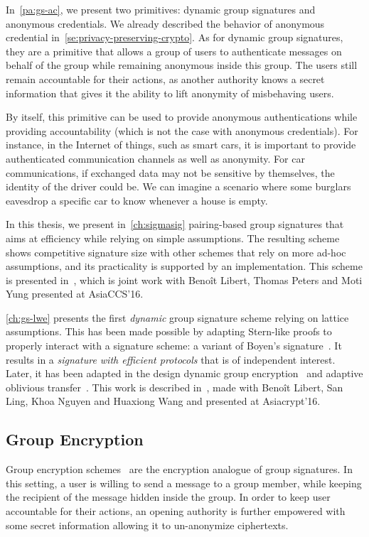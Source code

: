 In~\cref{pa:gs-ac}, we present two primitives: dynamic group signatures and anonymous credentials.
We already described the behavior of anonymous credential in~\cref{se:privacy-preserving-crypto}.
As for dynamic group signatures, they are a primitive that allows a group of users to authenticate messages on behalf of the group while remaining anonymous inside this group.
The users still remain accountable for their actions, as another authority knows a secret information that gives it the ability to lift anonymity of misbehaving users.

By itself, this primitive can be used to provide anonymous authentications while providing accountability (which is not the case with anonymous credentials).
For instance, in the Internet of things, such as smart cars, it is important to provide authenticated communication channels as well as anonymity. For car communications, if exchanged data may not be sensitive by themselves, the identity of the driver could be.
We can imagine a scenario where some burglars eavesdrop a specific car to know whenever a house is empty.

In this thesis, we present in~\cref{ch:sigmasig} pairing-based group signatures that aims at efficiency while relying on simple assumptions.
The resulting scheme shows competitive signature size with other schemes that rely on more ad-hoc assumptions, and its practicality is supported by an implementation.
This scheme is presented in~\cite{LMPY16}, which is joint work with Benoît Libert, Thomas Peters and Moti Yung presented at AsiaCCS'16.

\cref{ch:gs-lwe} presents the first \textit{dynamic} group signature scheme relying on lattice assumptions.
This has been made possible by adapting Stern-like proofs to properly interact with a signature scheme: a variant of Boyen's signature~\cite{Boy10,BHJ+15}.
It results in a \textit{signature with efficient protocols} that is of independent interest.
Later, it has been adapted in the design dynamic group encryption~\cite{LLM+16a} and adaptive oblivious transfer~\cite{LLM+17}.
This work is described in~\cite{LLM+16}, made with Benoît Libert, San Ling, Khoa Nguyen and Huaxiong Wang and presented at Asiacrypt'16.

\subsection{Group Encryption}

Group encryption schemes~\cite{KTY07} are the encryption analogue of group signatures.
In this setting, a user is willing to send a message to a group member, while keeping the recipient of the message hidden inside the group.
In order to keep user accountable for their actions, an opening authority is further empowered with some secret information allowing it to un-anonymize ciphertexts.

